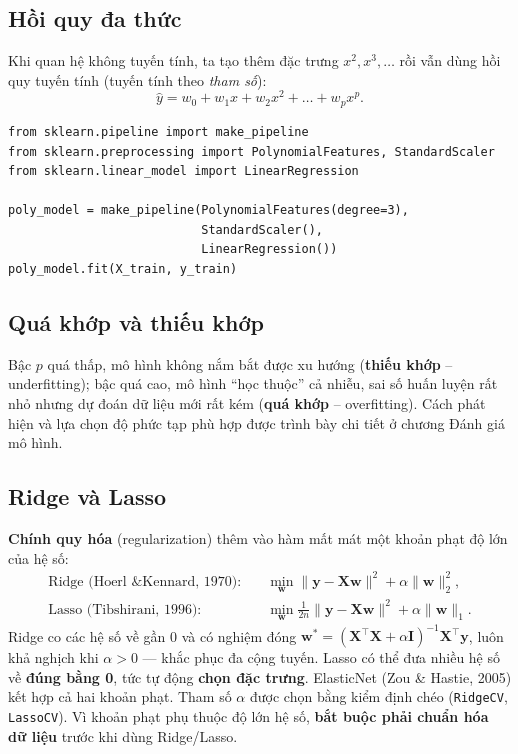 \subsection{Hồi quy đa thức}

Khi quan hệ không tuyến tính, ta tạo thêm đặc trưng $x^2, x^3, \dots$ rồi vẫn dùng hồi quy tuyến tính (tuyến tính theo \textit{tham số}):
\begin{equation}
    \hat{y} = w_0 + w_1 x + w_2 x^2 + \dots + w_p x^p .
\end{equation}

\begin{lstlisting}[caption={Hồi quy đa thức với PolynomialFeatures}]
from sklearn.pipeline import make_pipeline
from sklearn.preprocessing import PolynomialFeatures, StandardScaler
from sklearn.linear_model import LinearRegression

poly_model = make_pipeline(PolynomialFeatures(degree=3),
                           StandardScaler(),
                           LinearRegression())
poly_model.fit(X_train, y_train)
\end{lstlisting}

\subsection{Quá khớp và thiếu khớp}

Bậc $p$ quá thấp, mô hình không nắm bắt được xu hướng (\textbf{thiếu khớp} -- underfitting); bậc quá cao, mô hình ``học thuộc'' cả nhiễu, sai số huấn luyện rất nhỏ nhưng dự đoán dữ liệu mới rất kém (\textbf{quá khớp} -- overfitting). Cách phát hiện và lựa chọn độ phức tạp phù hợp được trình bày chi tiết ở chương Đánh giá mô hình.


\subsection{Ridge và Lasso}

\textbf{Chính quy hóa} (regularization) thêm vào hàm mất mát một khoản phạt độ lớn của hệ số:
\begin{align}
    \text{Ridge (Hoerl \& Kennard, 1970)}: \quad & \min_{\mathbf{w}} \|\mathbf{y} - \mathbf{X}\mathbf{w}\|^2 + \alpha \|\mathbf{w}\|_2^2, \\
    \text{Lasso (Tibshirani, 1996)}: \quad & \min_{\mathbf{w}} \tfrac{1}{2n}\|\mathbf{y} - \mathbf{X}\mathbf{w}\|^2 + \alpha \|\mathbf{w}\|_1 .
\end{align}
Ridge co các hệ số về gần 0 và có nghiệm đóng $\mathbf{w}^* = (\mathbf{X}^\top\mathbf{X} + \alpha\mathbf{I})^{-1}\mathbf{X}^\top\mathbf{y}$, luôn khả nghịch khi $\alpha > 0$ --- khắc phục đa cộng tuyến. Lasso có thể đưa nhiều hệ số về \textbf{đúng bằng 0}, tức tự động \textbf{chọn đặc trưng}. ElasticNet (Zou \& Hastie, 2005) kết hợp cả hai khoản phạt. Tham số $\alpha$ được chọn bằng kiểm định chéo (\texttt{RidgeCV}, \texttt{LassoCV}). Vì khoản phạt phụ thuộc độ lớn hệ số, \textbf{bắt buộc phải chuẩn hóa dữ liệu} trước khi dùng Ridge/Lasso.


